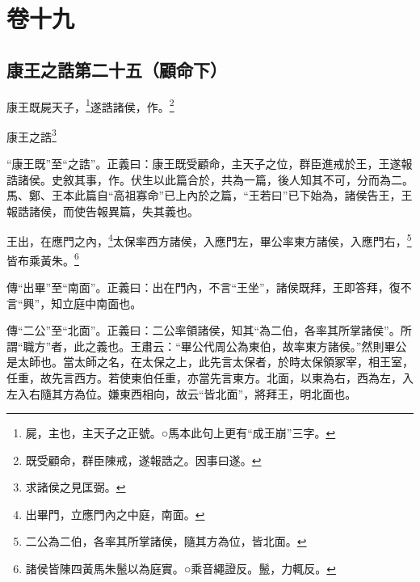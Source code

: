 

\chapter{卷十九}


\section{康王之誥第二十五（顧命下）}


康王既屍天子，\footnote{屍，主也，主天子之正號。○馬本此句上更有“成王崩”三字。}遂誥諸侯，作。\footnote{既受顧命，群臣陳戒，遂報誥之。因事曰遂。}

康王之誥\footnote{求諸侯之見匡弼。}

{\noindent\shu{}\fzkt “康王既”至“之誥”。正義曰：康王既受顧命，主天子之位，群臣進戒於王，王遂報誥諸侯。史敘其事，作。伏生以此篇合於，共為一篇，後人知其不可，分而為二。馬、鄭、王本此篇自“高祖寡命”已上內於之篇，“王若曰”已下始為，諸侯告王，王報誥諸侯，而使告報異篇，失其義也。 \par}

王出，在應門之內，\footnote{出畢門，立應門內之中庭，南面。}太保率西方諸侯，入應門左，畢公率東方諸侯，入應門右，\footnote{二公為二伯，各率其所掌諸侯，隨其方為位，皆北面。}皆布乘黃朱。\footnote{諸侯皆陳四黃馬朱鬛以為庭實。○乘音繩證反。鬛，力輒反。}


{\noindent\zhuan{}\fzbyks 傳“出畢”至“南面”。正義曰：出在門內，不言“王坐”，諸侯既拜，王即答拜，復不言“興”，知立庭中南面也。 \par}

{\noindent\zhuan{}\fzbyks 傳“二公”至“北面”。正義曰：二公率領諸侯，知其“為二伯，各率其所掌諸侯”。所謂“職方”者，此之義也。王肅云：“畢公代周公為東伯，故率東方諸侯。”然則畢公是太師也。當太師之名，在太保之上，此先言太保者，於時太保領冢宰，相王室，任重，故先言西方。若使東伯任重，亦當先言東方。北面，以東為右，西為左，入左入右隨其方為位。嫌東西相向，故云“皆北面”，將拜王，明北面也。 \par}

